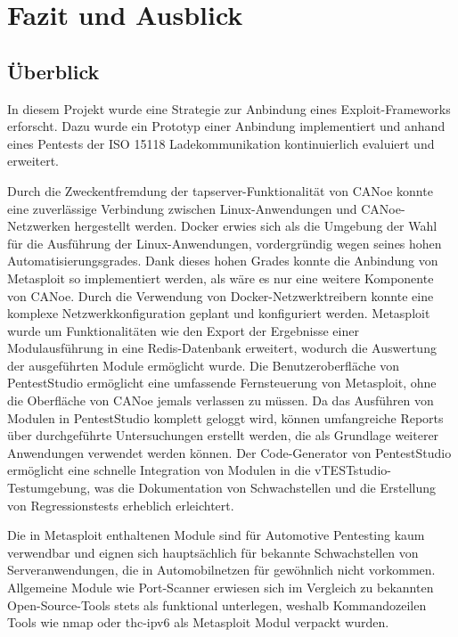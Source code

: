\chapter{Fazit und Ausblick}\label{sec:zusammenfassung}

\section{Überblick}\label{sec:ueberblickfazit}

In diesem Projekt wurde eine Strategie zur Anbindung eines Exploit-Frameworks erforscht. Dazu wurde ein Prototyp einer Anbindung implementiert und anhand eines Pentests der ISO 15118 Ladekommunikation kontinuierlich evaluiert und erweitert. 

Durch die Zweckentfremdung der tapserver-Funktionalität von CANoe konnte eine zuverlässige Verbindung zwischen Linux-Anwendungen und CANoe-Netzwerken hergestellt werden. Docker erwies sich als die Umgebung der Wahl für die Ausführung der Linux-Anwendungen, vordergründig wegen seines hohen Automatisierungsgrades. Dank dieses hohen Grades konnte die Anbindung von Metasploit so implementiert werden, als wäre es nur eine weitere Komponente von CANoe. Durch die Verwendung von Docker-Netzwerktreibern konnte eine komplexe Netzwerkkonfiguration geplant und konfiguriert werden. Metasploit wurde um Funktionalitäten wie den Export der Ergebnisse einer Modulausführung in eine Redis-Datenbank erweitert, wodurch die Auswertung der ausgeführten Module ermöglicht wurde. Die Benutzeroberfläche von PentestStudio ermöglicht eine umfassende Fernsteuerung von Metasploit, ohne die Oberfläche von CANoe jemals verlassen zu müssen. Da das Ausführen von Modulen in PentestStudio komplett geloggt wird, können umfangreiche Reports über durchgeführte Untersuchungen erstellt werden, die als Grundlage weiterer Anwendungen verwendet werden können. Der Code-Generator von PentestStudio ermöglicht eine schnelle Integration von Modulen in die vTESTstudio-Testumgebung, was die Dokumentation von Schwachstellen und die Erstellung von Regressionstests erheblich erleichtert. 

Die in Metasploit enthaltenen Module sind für Automotive Pentesting kaum verwendbar und eignen sich hauptsächlich für bekannte Schwachstellen von Serveranwendungen, die in Automobilnetzen für gewöhnlich nicht vorkommen. Allgemeine Module wie Port-Scanner erwiesen sich im Vergleich zu bekannten Open-Source-Tools stets als funktional unterlegen, weshalb Kommandozeilen Tools wie nmap oder thc-ipv6 als Metasploit Modul verpackt wurden. 

